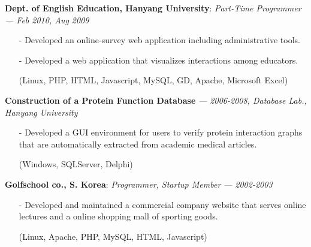   \vspace{-0.15in}
{\bf Dept. of English Education, Hanyang University}: \emph{Part-Time Programmer}
  {\it \footnotesize --- Feb 2010, Aug 2009}
  \begin{itemize}[leftmargin=*]
    \setlength\itemsep{-0.02in}
     \item[-] Developed an online-survey web application including administrative tools.
     \item[-] Developed a web application that visualizes interactions among educators.
     \item[] {\small(Linux, PHP, HTML, Javascript, MySQL, GD, Apache, Microsoft Excel)}
  \end{itemize}

  \vspace{-0.15in}
  {\bf Construction of a Protein Function Database} 
    {\it \footnotesize --- 2006-2008, Database Lab., Hanyang University}
    \begin{itemize}[leftmargin=*]
    \setlength\itemsep{-0.02in}
    \item[-] Developed a GUI environment for users to verify protein interaction graphs
             that are automatically extracted from academic medical articles.
    \item[] {\small(Windows, SQLServer, Delphi)}
    \end{itemize}

    
  \vspace{-0.15in}
  {\bf Golfschool co., S. Korea}: \emph{Programmer, Startup Member}
    {\it \footnotesize --- 2002-2003}
    \begin{itemize}[leftmargin=*]
    \setlength\itemsep{-0.02in}
     \item[-] Developed and maintained a commercial company website that 
              serves online lectures and a online shopping mall of sporting goods.
     \item[]  {\small(Linux, Apache, PHP, MySQL, HTML, Javascript)}
    \end{itemize}
